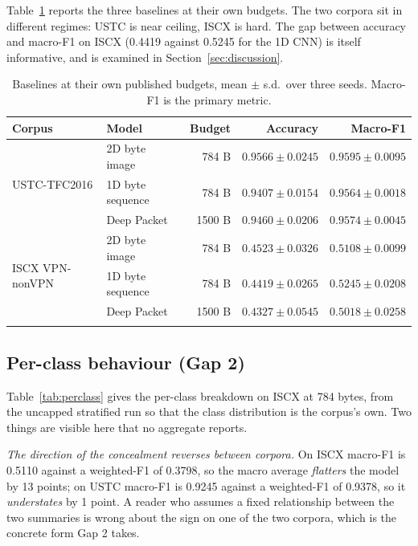 \documentclass[pdflatex,sn-mathphys-num]{sn-jnl}
\theoremstyle{thmstyleone}%
\theoremstyle{thmstylethree}%
\begin{document}
Table~\ref{tab:baselines} reports the three baselines at their own budgets. The
two corpora sit in different regimes: USTC is near ceiling, ISCX is hard. The
gap between accuracy and macro-F1 on ISCX (0.4419 against 0.5245 for the 1D
CNN) is itself informative, and is examined in Section~\ref{sec:discussion}.

\begin{table}[tbp]
\caption{Baselines at their own published budgets, mean $\pm$ s.d.\ over three
seeds. Macro-F1 is the primary metric.}\label{tab:baselines}
\begin{tabular}{@{}llrrr@{}}
\toprule
Corpus & Model & Budget & Accuracy & Macro-F1 \\
\midrule
\multirow{3}{*}{USTC-TFC2016}
 & 2D byte image~\cite{ustc} & 784 B & $0.9566 \pm 0.0245$ & $0.9595 \pm 0.0095$ \\
 & 1D byte sequence & 784 B & $0.9407 \pm 0.0154$ & $0.9564 \pm 0.0018$ \\
 & Deep Packet & 1500 B & $0.9460 \pm 0.0206$ & $0.9574 \pm 0.0045$ \\
\midrule
\multirow{3}{*}{ISCX VPN-nonVPN}
 & 2D byte image~\cite{ustc} & 784 B & $0.4523 \pm 0.0326$ & $0.5108 \pm 0.0099$ \\
 & 1D byte sequence & 784 B & $0.4419 \pm 0.0265$ & $0.5245 \pm 0.0208$ \\
 & Deep Packet & 1500 B & $0.4327 \pm 0.0545$ & $0.5018 \pm 0.0258$ \\
\botrule
\end{tabular}
\end{table}

\subsection{Per-class behaviour (Gap 2)}\label{sec:perclass}

Table~\ref{tab:perclass} gives the per-class breakdown on ISCX at 784 bytes,
from the uncapped stratified run so that the class distribution is the
corpus's own. Two things are visible here that no aggregate reports.

\emph{The direction of the concealment reverses between corpora.} On ISCX
macro-F1 is 0.5110 against a weighted-F1 of 0.3798, so the macro average
\emph{flatters} the model by 13 points; on USTC macro-F1 is 0.9245 against a
weighted-F1 of 0.9378, so it \emph{understates} by 1 point. A reader who
assumes a fixed relationship between the two summaries is wrong about the sign
on one of the two corpora, which is the concrete form Gap 2 takes.
\end{document}
